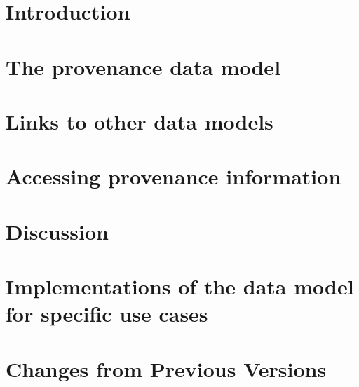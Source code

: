 \documentclass[11pt,a4paper]{ivoa}
\begin{document}
\section{Introduction}






\section{The provenance data model}



\clearpage
\section{Links to other data models}
\label{sec:dmlinks}



\clearpage
\section{Accessing provenance information}



\section{Discussion}



\section{Implementations of the data model for specific use cases}
\label{sec:usecases-implementations}



\appendix
\section{Changes from Previous Versions}
\end{document}
